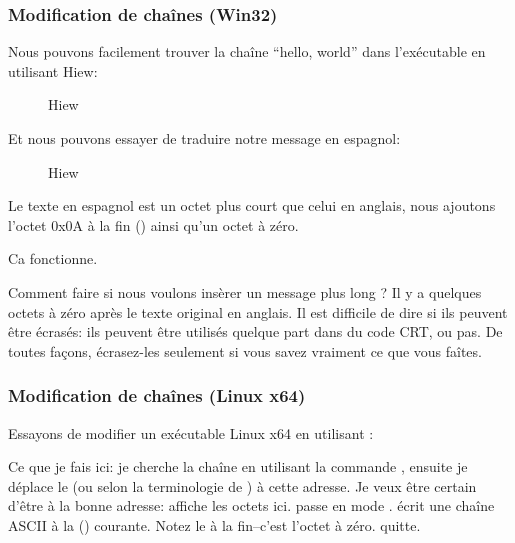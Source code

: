 \subsubsection{Modification de chaînes (Win32)}

Nous pouvons facilement trouver la chaîne ``hello, world'' dans l'exécutable en utilisant Hiew:

\begin{figure}[H]
\centering
{}
\caption{Hiew}
\label{}
\end{figure}

Et nous pouvons essayer de traduire notre message en espagnol:

\begin{figure}[H]
\centering
{}
\caption{Hiew}
\label{}
\end{figure}

Le texte en espagnol est un octet plus court que celui en anglais, nous ajoutons l'octet 0x0A à la fin
 () ainsi qu'un octet à zéro.

Ca fonctionne.

Comment faire si nous voulons insèrer un message plus long ?
Il y a quelques octets à zéro après le texte original en anglais.
Il est difficile de dire si ils peuvent être écrasés: ils peuvent être utilisés quelque part dans du code \ac{CRT},
ou pas.
De toutes façons, écrasez-les seulement si vous savez vraiment ce que vous faîtes.

\subsubsection{Modification de chaînes (Linux x64)}

\myindex{\radare}
Essayons de modifier un exécutable Linux x64 en utilisant \radare:



Ce que je fais ici: je cherche la chaîne  en utilisant la commande  \TT{/},
ensuite je déplace le  (ou  selon la terminologie de \radare) à cette adresse.
Je veux être certain d'être à la bonne adresse:  affiche les octets ici.
 passe \radare en mode .
 écrit une chaîne ASCII à la  () courante.
Notez le  à la fin--c'est l'octet à zéro.
 quitte.

